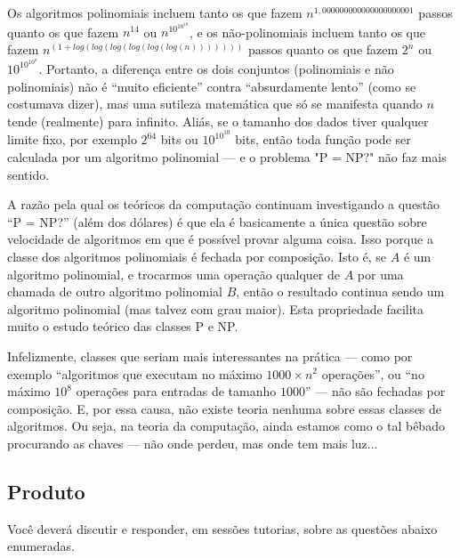 Os algoritmos polinomiais incluem tanto os que fazem
$n^{1,000000000000000000001}$ passos quanto os que fazem $n^{14}$ 
ou $n^{10^{10^{10}}}$, e os não-polinomiais incluem tanto os que fazem 
$n^{(1+log(log(log(log(log(log(n)))))))}$ passos quanto os que fazem $2^{n}$
ou $10^{10^{10^{n}}}$. 
Portanto, a diferença entre os dois conjuntos (polinomiais e não
polinomiais) não é ``muito eficiente'' contra ``absurdamente lento'' (como
se costumava dizer), mas uma sutileza matemática que só se manifesta
quando $n$ tende (realmente) para infinito.
Aliás, se o tamanho dos dados tiver qualquer limite fixo, por exemplo
$2^{64}$ bits ou $10^{10^{10}}$ bits, então toda função pode ser calculada por um algoritmo
polinomial --- e o problema "P = NP?" não faz mais sentido.

A razão pela qual os teóricos da computação continuam investigando a
questão ``P = NP?'' (além dos dólares) é que ela é basicamente a
única questão sobre velocidade de algoritmos em que é possível provar
alguma coisa. Isso porque a classe dos algoritmos polinomiais é
fechada por composição. Isto é, se $A$ é um algoritmo polinomial, e
trocarmos uma operação qualquer de $A$ por uma chamada de outro
algoritmo polinomial $B$, então o resultado continua sendo um algoritmo
polinomial (mas talvez com grau maior).
Esta propriedade facilita muito o estudo teórico das classes P e NP.

Infelizmente, classes que seriam mais interessantes na prática ---
como por exemplo ``algoritmos que executam no máximo $1000 \times n^{2}$
operações'', ou ``no máximo $10^{8}$ operações para entradas de tamanho
$1000$'' --- não são fechadas por composição. E, por essa causa, não
existe teoria nenhuma sobre essas classes de algoritmos.
Ou seja, na teoria da computação, ainda estamos como o tal bêbado
procurando as chaves --- não onde perdeu, mas onde tem mais luz...

\subsection{Produto}
Você deverá discutir e responder, em sessões tutorias,
sobre as questões abaixo enumeradas.



